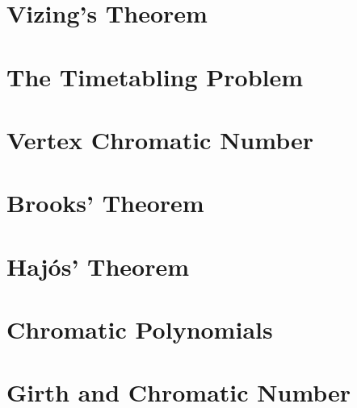 		\section{Vizing's Theorem}

		\section{The Timetabling Problem}

		\section{Vertex Chromatic Number}

		\section{Brooks' Theorem}

		\section{Haj\'{o}s' Theorem}

		\section{Chromatic Polynomials}

		\section{Girth and Chromatic Number}

